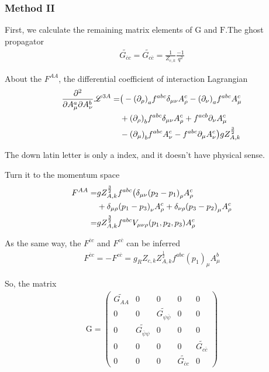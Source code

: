 \documentclass[UTF8]{ctexart}
\begin{document}
\subsubsection{Method II}
\par First, we calculate the remaining matrix elements of $\mathrm{G}$ and $\mathrm{F}$.The ghost propagator
\begin{align}
\widetilde{G_{\overline{c}c}}=\widetilde{G_{c\overline{c}}}=\frac{1}{Z_{c,k}}\frac{-1}{q^2}
\end{align}
\par About the $F^{AA}$, the differential coefficient of interaction Lagrangian
\begin{align}
\frac {\partial^2}{\partial A_{\mu}^{a} \partial A_{\nu}^{b}}\mathscr{L}^{3A}=&\big(-{(\partial_\rho)}_{a}f^{abc}\delta_{\mu\nu}A_{\rho}^{c}-{(\partial_\nu)}_{a}f^{abc}A_{\mu}^{c}
\notag\\&+{(\partial_\rho)}_{b}f^{abc}\delta_{\mu\nu}A_{\rho}^{c}+f^{acb}\partial_{\nu}A_{\mu}^{c}
\notag\\&-{(\partial_{\mu})}_{b}f^{abc}A_{\nu}^{c}-f^{abc}\partial_{\mu}A_{\nu}^{c}\big)gZ_{A,k}^{\frac{3}{2}}
\end{align}
\par The down latin letter is only a index, and it doesn't have physical sense.
\par Turn it to the momentum space
\begin{align}
F^{AA}=&gZ_{A,k}^{\frac{3}{2}}f^{abc}\big(\delta_{\mu\nu}{(p_2-p_1)}_{\rho}A_{\rho}^{c}
\notag\\&+\delta_{\mu\rho}{(p_1-p_3)}_{\nu}A_{\rho}^{c}+\delta_{\nu\rho}{(p_3-p_2)}_{\mu}A_{\rho}^{c}
\notag\\=&gZ_{A,k}^{\frac{3}{2}}f^{abc}V_{\mu\nu\rho}(p_1,p_2,p_3)A_{\rho}^{c}
\end{align}
\par As the same way, the $F^{\overline{c}c}$ and $F^{c\overline{c}}$ can be inferred
\begin{align}
F^{\overline{c}c}=-F^{c\overline{c}}=g_{R}Z_{c,k}Z_{A,k}^{\frac{1}{2}}f^{abc}{(p_1)}_{\mu}A_{\mu}^{b}
\end{align}
\par So, the matrix
\begin{gather}
\mathrm{G}=\begin{pmatrix}\widetilde{G_{AA}}&0&0&0&0\\0&0&\widetilde{G_{\psi\overline{\psi}}}&0&0\\0&{\widetilde{G_{\overline{\psi}\psi}}}&0&0&0\\0&0&0&0&\widetilde{G_{c\overline{c}}}\\0&0&0&\widetilde{G_{\overline{c}c}}&0\end{pmatrix}
\end{gather}
\end{document}
